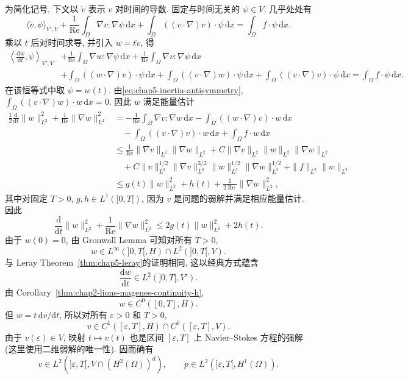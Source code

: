 \begin{Proof}
为简化记号, 下文以 $\dot v$ 表示 $v$ 对时间的导数. 固定与时间无关的 $\psi\in V$. 几乎处处有
\[
 \langle\dot v,\psi\rangle_{V',V}
 +\frac1{\operatorname{Re}}\int_\Omega\nabla v:\nabla\psi\,\mathrm dx
 +\int_\Omega((v\cdot\nabla)v)\cdot\psi\,\mathrm dx
 =\int_\Omega f\cdot\psi\,\mathrm dx.
\]
乘以 $t$ 后对时间求导, 并引入 $w=t\dot v$, 得
\begin{align*}
 \left\langle\frac{\mathrm dw}{\mathrm dt},\psi\right\rangle_{V',V}
 &+\frac1{\operatorname{Re}}\int_\Omega\nabla w:\nabla\psi\,\mathrm dx
 +\frac1{\operatorname{Re}}\int_\Omega\nabla v:\nabla\psi\,\mathrm dx\\
 &+\int_\Omega((w\cdot\nabla)v)\cdot\psi\,\mathrm dx
 +\int_\Omega((v\cdot\nabla)w)\cdot\psi\,\mathrm dx
 +\int_\Omega((v\cdot\nabla)v)\cdot\psi\,\mathrm dx
 =\int_\Omega f\cdot\psi\,\mathrm dx.
\end{align*}
在该恒等式中取 $\psi=w(t)$. 由\eqref{eq:chap5-inertia-antisymmetry}, $\int_\Omega((v\cdot\nabla)w)\cdot w\,\mathrm dx=0$. 因此 $w$ 满足能量估计
\begin{align*}
 \frac12\frac{\mathrm d}{\mathrm dt}\|w\|_{L^2}^2
 +\frac1{\operatorname{Re}}\|\nabla w\|_{L^2}^2
 &=-\frac1{\operatorname{Re}}\int_\Omega\nabla v:\nabla w\,\mathrm dx
 -\int_\Omega((w\cdot\nabla)v)\cdot w\,\mathrm dx\\
 &\quad-\int_\Omega((v\cdot\nabla)v)\cdot w\,\mathrm dx
 +\int_\Omega f\cdot w\,\mathrm dx\\
 &\leq\frac1{\operatorname{Re}}\|\nabla v\|_{L^2}\|\nabla w\|_{L^2}
 +C\|\nabla v\|_{L^2}\|w\|_{L^2}\|\nabla w\|_{L^2}\\
 &\quad+C\|v\|_{L^2}^{1/2}\|\nabla v\|_{L^2}^{3/2}
 \|w\|_{L^2}^{1/2}\|\nabla w\|_{L^2}^{1/2}
 +\|f\|_{L^2}\|w\|_{L^2}\\
 &\leq g(t)\|w\|_{L^2}^2+h(t)
 +\frac1{2\operatorname{Re}}\|\nabla w\|_{L^2}^2,
\end{align*}
其中对固定 $T>0$, $g,h\in L^1(]0,T[)$, 因为 $v$ 是问题的弱解并满足相应能量估计. 因此
\[
 \frac{\mathrm d}{\mathrm dt}\|w\|_{L^2}^2
 +\frac1{\operatorname{Re}}\|\nabla w\|_{L^2}^2
 \leq2g(t)\|w\|_{L^2}^2+2h(t).
\]
由于 $w(0)=0$, 由 Gronwall Lemma 可知对所有 $T>0$,
\[
 w\in L^\infty(]0,T[,H)\cap L^2(]0,T[,V).
\]
与 Leray Theorem~\ref{thm:chap5-leray}的证明相同, 这以经典方式蕴含
\[
 \frac{\mathrm dw}{\mathrm dt}\in L^2(]0,T[,V').
\]
由 Corollary~\ref{thm:chap2-lions-magenes-continuity-h},
\[
 w\in C^0([0,T],H).
\]
但 $w=t\,\mathrm dv/\mathrm dt$, 所以对所有 $\varepsilon>0$ 和 $T>0$,
\[
 v\in C^1([\varepsilon,T],H)\cap C^0([\varepsilon,T],V).
\]
由于 $v(\varepsilon)\in V$, 映射 $t\mapsto v(t)$ 也是区间 $[\varepsilon,T]$ 上 Navier--Stokes 方程的强解 (这里使用二维弱解的唯一性). 因而确有
\[
 v\in L^2(]\varepsilon,T[,V\cap(H^2(\Omega))^d),
 \qquad
 p\in L^2(]\varepsilon,T[,H^1(\Omega)).
\]
\end{Proof}
